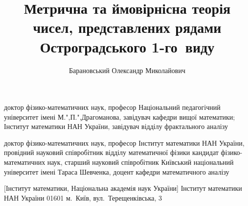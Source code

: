 \documentclass{vakaref}
\theoremstyle{plain}
\theoremstyle{definition}
\theoremstyle{remark}
\begin{document}
\title{Метрична та ймовірнісна теорія чисел,
  представлених рядами Остроградського 1-го~виду}
\author{Барановський Олександр Миколайович}
  {доктор фізико-математичних наук, професор}
  {Національний педагогічний університет імені {М.",П.",Драгоманова},
   завідувач кафедри вищої математики;
   Інститут математики НАН України,
   завідувач відділу фрактального аналізу}

  {доктор фізико-математичних наук, професор}
  {Інститут математики НАН України,
   провідний науковий співробітник відділу математичної фізики}
  {кандидат фізико-математичних наук, \linebreak[1] старший науковий співробітник}
  {Київський національний університет імені Тараса Шевченка,
   доцент кафедри математичного аналізу}


  [Інститут математики, Національна академія наук України]
  {Інститут математики НАН України}
  {01601 м.~Київ, вул.~Терещенківська, 3}

\end{document}
